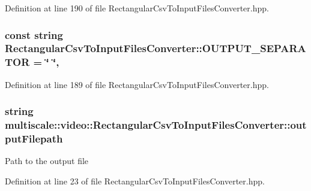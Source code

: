Definition at line 190 of file Rectangular\-Csv\-To\-Input\-Files\-Converter.\-hpp.

\hypertarget{classmultiscale_1_1video_1_1RectangularCsvToInputFilesConverter_a8bc759087441c9d9ec210d30e193cf8a}{
\subsubsection[{O\-U\-T\-P\-U\-T\-\_\-\-S\-E\-P\-A\-R\-A\-T\-O\-R}]{\setlength{\rightskip}{0pt plus 5cm}const string Rectangular\-Csv\-To\-Input\-Files\-Converter\-::\-O\-U\-T\-P\-U\-T\-\_\-\-S\-E\-P\-A\-R\-A\-T\-O\-R = \char`\"{} \char`\"{}\hspace{0.3cm}{\ttfamily [static]}, {\ttfamily [private]}}}\label{classmultiscale_1_1video_1_1RectangularCsvToInputFilesConverter_a8bc759087441c9d9ec210d30e193cf8a}


Definition at line 189 of file Rectangular\-Csv\-To\-Input\-Files\-Converter.\-hpp.

\hypertarget{classmultiscale_1_1video_1_1RectangularCsvToInputFilesConverter_a2bb6a802fac9b0928bc53a8c71a1c33c}{
\subsubsection[{output\-Filepath}]{\setlength{\rightskip}{0pt plus 5cm}string multiscale\-::video\-::\-Rectangular\-Csv\-To\-Input\-Files\-Converter\-::output\-Filepath\hspace{0.3cm}{\ttfamily [private]}}}\label{classmultiscale_1_1video_1_1RectangularCsvToInputFilesConverter_a2bb6a802fac9b0928bc53a8c71a1c33c}
Path to the output file 

Definition at line 23 of file Rectangular\-Csv\-To\-Input\-Files\-Converter.\-hpp.

